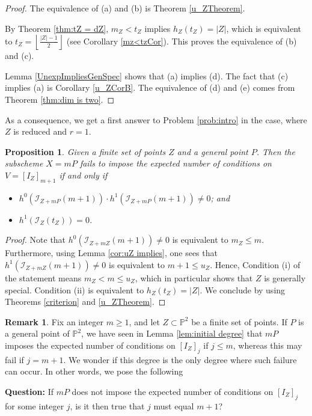 \documentclass[12pt]{amsart}
\numberwithin{equation}{section}
\newtheorem{proposition}[theorem]{Proposition}
\theoremstyle{definition}
\newtheorem{remark}[theorem]{Remark}
\begin{document}
\begin{proof}
The equivalence of (a) and (b) is Theorem \ref{u_ZTheorem}. 

By Theorem \ref{thm:tZ = dZ}, $m_Z < t_Z$ implies $h_Z (t_Z) = |Z|$, which is equivalent to $ t_Z = \left \lfloor \frac{|Z| -1}{2} \right \rfloor$ (see Corollary \ref{mz<tzCor}). This proves the equivalence of (b) and (c). 

Lemma \ref{UnexpImpliesGenSpec} shows that (a) implies (d).  The fact that (c) implies (a) is Corollary \ref{u_ZCorB}. The equivalence of (d) and (e) comes from Theorem \ref{thm:dim is two}.
\end{proof}

As a consequence, we get a first answer to Problem \ref{prob:intro} in the case, where $Z$ is reduced and $r=1$. 

\begin{proposition}
   \label{prop:intro}
Given a finite set of points $Z$  and a general point $P$. Then the subscheme $X = m P$ fails to impose the expected number of conditions on  $V = [I_Z]_{m+1}$ if and only if 
\begin{itemize}
\item[(i)]  $h^0 ({\mathcal{I}}_{Z + m P} (m+1)) \cdot h^1 ({\mathcal{I}}_{Z + m P} (m+1)) \neq 0$; \quad and 

\item[(ii)] $h^1 ({\mathcal{I}}_{Z} (t_Z)) = 0$. 
\end{itemize} 
\end{proposition}

\begin{proof}
Note that $h^0 ({\mathcal{I}}_{Z + mZ} (m+1)) \neq 0$ is equivalent to $m_Z \le m$. Furthermore, using Lemma \ref{cor:uZ implies}, one sees that  $h^1 ({\mathcal{I}}_{Z + mZ} (m+1)) \neq 0$ is equivalent to $m+1 \le u_Z$. Hence, Condition (i) of the statement means $m_Z < m \le u_Z$, which in particular shows that $Z$ is generally special. Condition (ii) is equivalent to $h_Z (t_Z) = |Z|$. We conclude by using  Theorems \ref{criterion} and \ref{u_ZTheorem}. 
\end{proof}

\begin{remark}
   \label{rem:question}
Fix an integer $m \ge 1$, and let $Z \subset { \ensuremath{\mathbb{P}}}^2$ be a finite set of points. If $P$ is a general point of ${ \ensuremath{\mathbb{P}}}^2$, we have seen in Lemma \ref{lem:initial degree} that $mP$ imposes the expected number of conditions on $[I_Z]_j$ if $j \le m$, whereas this may fail if $j = m+1$. We wonder if this degree is the only degree where such failure can occur. In other words, we pose the following 
\smallskip 

\noindent
{\bf Question:} If $mP$ does not impose the expected number of conditions on $[I_Z]_j$ for some integer $j$, is it then true that $j$ must equal $m+1$?
\end{remark} 
\end{document}
